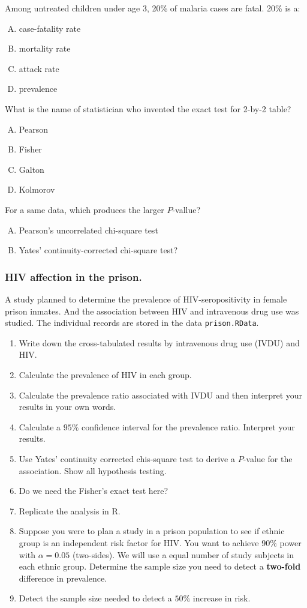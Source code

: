 \documentclass[11pt,a4paper]{article}
\begin{document}
\begin{CJK*}{UTF8}{gbsn}
Among untreated children under age 3, 20\% of malaria cases are fatal. 20\% is a:
\begin{enumerate}[(A)]
  \item case-fatality rate
  \item mortality rate
  \item attack rate
  \item prevalence
\end{enumerate}


What is the name of statistician who invented the exact test for 2-by-2 table?
\begin{enumerate}[(A)]
  \item Pearson
  \item Fisher
  \item Galton
  \item Kolmorov 
\end{enumerate}


For a same data, which produces the larger $P$-vallue?
\begin{enumerate}[(A)]
  \item Pearson's uncorrelated chi-square test
  \item Yates' continuity-corrected chi-square test?
\end{enumerate}


\subsubsection{HIV affection in the prison.}
A study planned to determine the prevalence of HIV-seropositivity in 
female prison inmates. And the association between HIV and intravenous 
drug use was studied. The individual records are stored in the data 
\texttt{prison.RData}.
\begin{enumerate}[(1)]
	\item Write down the cross-tabulated results by intravenous 
		drug use (IVDU) and HIV.
	\item Calculate the prevalence of HIV in each group.
	\item Calculate the prevalence ratio associated with IVDU and then 
		interpret your results in your own words.
	\item Calculate a $95\%$ confidence interval for the prevalence 
		ratio. Interpret your results.
	\item Use Yates' continuity corrected chis-square test to derive a 
		$P$-value for the association. Show all hypothesis testing.
	\item Do we need the Fisher's exact test here?
	\item Replicate the analysis in R.
	\item Suppose you were to plan a study in a prison population to 
		see if ethnic group is an independent risk factor for HIV. 
		You want to achieve $90\%$ power with $\alpha=0.05$ 
		(two-sides). We will use a equal number of study subjects 
		in each ethnic group. Determine the sample size you need 
		to detect a \textbf{two-fold} difference in prevalence.
	\item Detect the sample size needed to detect a $50\%$ increase in 
		risk.
\end{enumerate}


\end{CJK*}
\end{document}
